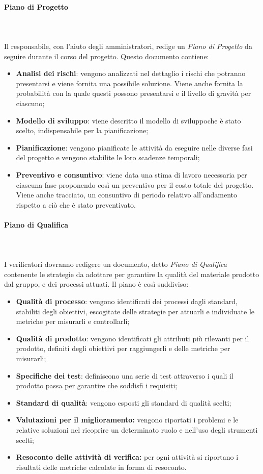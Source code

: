		\paragraph{Piano di Progetto} \mbox{}\\ \mbox{}\\
		Il responsabile, con l'aiuto degli amministratori, redige un \textit{Piano di Progetto} da seguire durante il corso del progetto. Questo documento contiene:
		\begin{itemize}
			\item \textbf{Analisi dei rischi}: vengono analizzati nel dettaglio i rischi che potranno presentarsi e viene fornita una possibile soluzione. Viene anche fornita la probabilità con la quale questi possono presentarsi e il livello di gravità per ciascuno;
			\item \textbf{Modello di sviluppo\glo}: viene descritto il modello di sviluppo\glosp che è stato scelto, indispensabile per la pianificazione;
			\item \textbf{Pianificazione}: vengono pianificate le attività da eseguire nelle diverse fasi del progetto e vengono stabilite le loro scadenze temporali;
			\item \textbf{Preventivo e consuntivo}: viene data una stima di lavoro necessaria per ciascuna fase proponendo così un preventivo per il costo totale del progetto. Viene anche tracciato, un consuntivo di periodo relativo all'andamento rispetto a ciò che è stato preventivato.
		\end{itemize}
		\paragraph{Piano di Qualifica} \mbox{}\\ \mbox{}\\
		I verificatori dovranno redigere un documento, detto \textit{Piano di Qualifica} contenente le strategie da adottare per garantire la qualità del materiale prodotto dal gruppo, e dei processi attuati. Il piano è così suddiviso:
		\begin{itemize}
			\item \textbf{Qualità di processo}: vengono identificati dei processi dagli standard, stabiliti degli obiettivi, escogitate delle strategie per attuarli e individuate le metriche per misurarli e controllarli;
			\item \textbf{Qualità di prodotto}: vengono identificati gli attributi più rilevanti per il prodotto, definiti degli obiettivi per raggiungerli e delle metriche per misurarli;
			\item \textbf{Specifiche dei test}: definiscono una serie di test attraverso i quali il prodotto passa per garantire che soddisfi i requisiti;
			\item \textbf{Standard di qualità}: vengono esposti gli standard di qualità scelti;
			\item \textbf{Valutazioni per il miglioramento:} vengono riportati i problemi e le relative soluzioni nel ricoprire un determinato ruolo e nell'uso degli strumenti scelti;
			\item \textbf{Resoconto delle attività di verifica:} per ogni attività si riportano i risultati delle metriche calcolate in forma di resoconto.
		\end{itemize}
